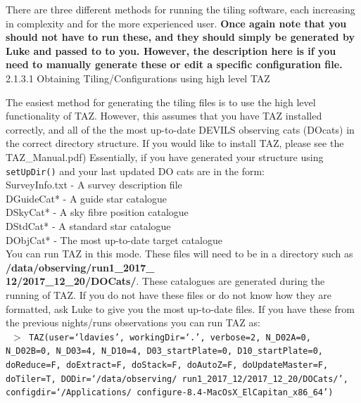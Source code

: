 \documentclass[12pt]{article}
\begin{document}
There are three different methods for running the tiling software, each increasing in complexity and for the more experienced user. \textbf{\textcolor{PineGreen}{Once again note that you should not have to run these, and they should simply be generated by Luke and passed to to you. However, the description here is if you need to manually generate these or edit a specific configuration file.}}\\

\textsf{2.1.3.1 Obtaining Tiling/Configurations using high level TAZ}
\vspace{2mm}

The easiest method for generating the tiling files is to use the high level functionality of TAZ. However, this assumes that you have TAZ installed correctly, and all of the the most up-to-date DEVILS observing cats (DOcats) in the correct directory structure. If you would like to install TAZ, please see the TAZ\_Manual.pdf) Essentially, if you have generated your structure using \texttt{setUpDir()} and your last updated DO cats are in the form: \\

SurveyInfo.txt - A survey description file \\
DGuideCat* - A guide star catalogue \\
DSkyCat* - A sky fibre position catalogue \\
DStdCat* - A standard star catalogue \\
DObjCat* - The most up-to-date target catalogue \\

You can run TAZ in this mode. These files will need to be in a directory such as \textbf{/data/observing/run1\_2017\_ \\ 12/2017\_12\_20/DOCats/}. These catalogues are generated during the running of TAZ. If you do not have these files or do not know how they are formatted, ask Luke to give you the most up-to-date files. If you have these from the previous nights/runs observations you can run TAZ as: \\

\texttt{ $>$ TAZ(user=`ldavies', workingDir=`.', verbose=2, N\_D02A=0, N\_D02B=0, N\_D03=4, N\_D10=4, D03\_startPlate=0, D10\_startPlate=0, doReduce=F, doExtract=F, 
doStack=F, doAutoZ=F, doUpdateMaster=F, doTiler=T, DODir=`/data/observing/ \\ run1\_2017\_12/2017\_12\_20/DOCats/', configdir=`/Applications/ \\configure-8.4-MacOsX\_ElCapitan\_x86\_64')} \\
\end{document}
